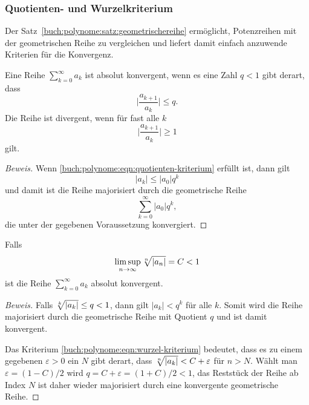 %
%
\subsubsection{Quotienten- und Wurzelkriterium}
Der Satz~\ref{buch:polynome:satz:geometrischereihe} ermöglicht,
Potenzreihen mit der geometrischen Reihe zu vergleichen und
liefert damit einfach anzuwende Kriterien für die Konvergenz.

\begin{satz}[Quotientenkriterium]
%
\label{buch:polynome:satz:quotientenkriterium}
%
Eine Reihe 
\(
\sum_{k=0}^\infty  a_k
\)
ist absolut konvergent, wenn es eine Zahl $q<1$ gibt derart, dass
\begin{equation}
\biggl|\frac{a_{k+1}}{a_k}\biggr|\le q.
\label{buch:polynome:eqn:quotienten-kriterium}
\end{equation}
Die Reihe ist divergent, wenn für fast alle $k$
\[
\biggl|\frac{a_{k+1}}{a_k}\biggr| \ge 1
\]
gilt.
\end{satz}

\begin{proof}[Beweis]
Wenn \eqref{buch:polynome:eqn:quotienten-kriterium} erfüllt ist, dann
gilt
\[
|a_k| \le |a_0| q^k
\]
und damit ist die Reihe majorisiert durch die geometrische Reihe 
\[
\sum_{k=0}^\infty
|a_0|q^k,
\]
die unter der gegebenen Voraussetzung konvergiert.
\end{proof}

\begin{satz}[Wurzelkriterium]
%
\label{buch:polynome:satz:wurzelkriterium}
Falls
\begin{equation}
\limsup_{n\to\infty} \root{n}\of{|a_n|} = C < 1
\label{buch:polynome:eqn:wurzel-kriterium}
\end{equation}
ist die Reihe
\(
\sum_{k=0}^\infty a_k
\)
absolut konvergent.
\end{satz}

\begin{proof}[Beweis]
Falls $\root{k}\of{|a_k|}\le q<1$, dann gilt
$|a_k|<q^k$ für alle $k$.
Somit wird die Reihe majorisiert durch die geometrische Reihe
mit Quotient $q$ und ist damit konvergent.

Das Kriterium \eqref{buch:polynome:eqn:wurzel-kriterium} bedeutet,
dass es zu einem gegebenen $\varepsilon > 0$ ein $N$ gibt derart,
dass $\root{n}\of{|a_k|} < C+\varepsilon$ für $n>N$.  
Wählt man $\varepsilon = (1-C)/2$ wird $q=C+\varepsilon=(1+C)/2<1$,
das Reststück der Reihe ab Index $N$ ist daher wieder majorisiert
durch eine konvergente geometrische Reihe.
\end{proof}

